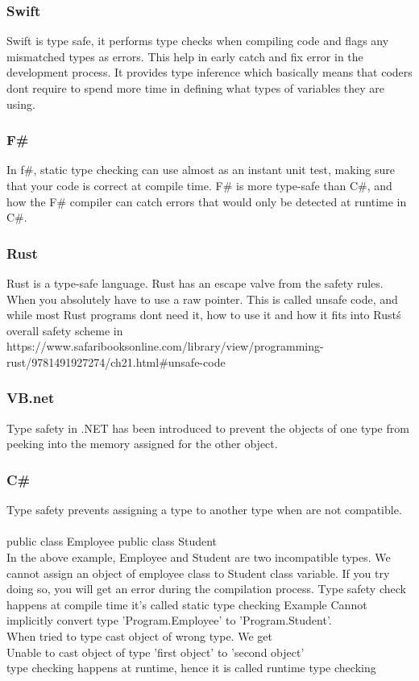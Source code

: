 \documentclass{sig-alternate}
\begin{document}
	\subsubsection{Swift}
	Swift is type safe, it performs type checks when compiling code and flags any mismatched types as errors. This help in early catch and fix error in the development process. 
	It provides type inference which basically means that coders dont require to spend more time in defining what types of variables they are using.
	\subsubsection{F\#}
	In f\#, static type checking can use almost as an instant unit test, making sure that your code is correct at compile time.
	F\# is more type-safe than C\#, and how the F\# compiler can catch errors that would only be detected at runtime in C\#.
	\subsubsection{Rust }
	Rust is a type-safe language. Rust has an escape valve from the safety rules. When you absolutely have to use a raw pointer. This is called unsafe code, and while most Rust programs dont need it, 
	how to use it and how it fits into Rust\'s overall safety scheme in
	\\ https://www.safaribooksonline.com/library/view/programming-rust/9781491927274/ch21.html\#unsafe-code
	
	\subsubsection{VB.net}
	Type safety in .NET has been introduced to prevent the objects of one type from peeking into the memory assigned for the other object.
	\subsubsection{C\#}
	Type safety prevents assigning a type to another type when are not compatible.\\ \\
	public class Employee{}
	public class Student{}\\
	
	In the above example, Employee and Student are two incompatible types. We cannot assign an object of employee class to Student class variable. If you try doing so, you will get an error during the compilation process. Type safety check happens at compile time it's called static type checking
	Example
	Cannot implicitly convert type 'Program.Employee' to 'Program.Student'. \\ When tried to type cast object of wrong type. We get \\
	Unable to cast object of type 'first object' to 'second object'\\
	type checking happens at runtime, hence it is called runtime type checking\\
\end{document}
